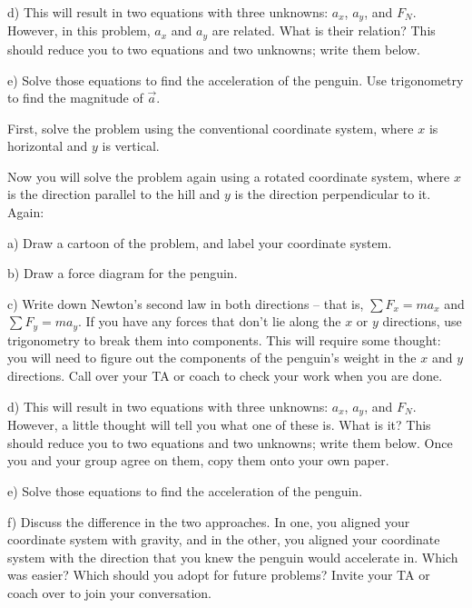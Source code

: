 \documentclass[12pt]{article}
\begin{document}
\vspace{1.7in}

d) This will result in two equations with three unknowns: $a_x$, $a_y$, and $F_N$. However, in this problem, $a_x$ and $a_y$ are related. What is their relation? This should reduce you to two equations and two unknowns; write them below.
\vspace{1.7in}

e) Solve those equations to find the acceleration of the penguin. Use trigonometry to find the magnitude of $\vec a$.

\newpage

First, solve the problem using the conventional coordinate system, where $x$ is horizontal and $y$ is vertical. 

Now you will solve the problem again using a rotated coordinate system, where $x$ is the direction parallel to the hill and $y$ is the direction perpendicular to it. Again:

a) Draw a cartoon of the problem, and label your coordinate system. 

\vspace{2.5in}

b) Draw a force diagram for the penguin. 


\newpage

c) Write down Newton's second law in both directions -- that is, $\sum F_x = ma_x$ and $\sum F_y = ma_y$. 
If you have any forces that don't lie along the $x$ or $y$ directions, use trigonometry to break them into components.
This will require some thought: you will need to figure out the components of the 
penguin's weight in the $x$ and $y$ directions. Call over your TA or coach to check your work when you are done.

\vspace{3in}


d) This will result in two equations with three unknowns: $a_x$, $a_y$, and $F_N$. However, a little thought will
tell you what one of these is. What is it? This should reduce you to two equations and two unknowns; write them below. Once you and your group agree on them, copy them onto your own paper.

\vspace{2in}
\newpage
e) Solve those equations to find the acceleration of the penguin.

\vspace{2in}

f) Discuss the difference in the two approaches. In one, you aligned your coordinate system with gravity, and in the other, you aligned your coordinate system with the direction that you knew the penguin would accelerate in. Which was easier? Which 
should you adopt for future problems? Invite your TA or coach over to join your conversation.
\end{document}
